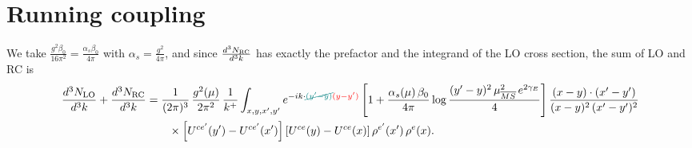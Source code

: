 \documentclass[9pt]{article}
\numberwithin{equation}{section}
\begin{document}
\section{Running coupling}
We take $\frac{g^{2}\beta_{0}}{16\pi^{2}}=\frac{\alpha_{s}\beta_{0}}{4\pi}$ with $\alpha_{s}=\frac{g^{2}}{4\pi}$, and since $\frac{d^{3}N_{\rm RC}}{d^{3}k}$ has exactly the prefactor and the integrand of the LO cross section, the sum of LO and RC is
\begin{align}
\frac{d^{3}N_{\rm LO}}{d^{3}k}+\frac{d^{3}N_{\rm RC}}{d^{3}k}&=\frac{1}{(2\pi)^{3}}\,\frac{g^{2}(\mu)}{2\pi^{2}}\,\frac{1}{k^{+}}\int_{x,y,x',y'}e^{-ik\cdot{\color{teal}\cancel{(y'-y)}}{\color{red}(y-y')}}\left[1+\frac{\alpha_{s}(\mu)\,\beta_{0}}{4\pi}\log\frac{(y'-y)^{2}\,\mu^{2}_{\overline{MS}}\,e^{2\gamma_{E}}}{4}\right]\frac{(x-y)\cdot(x'-y')}{(x-y)^{2}\,(x'-y')^{2}}\notag\\
&\qquad\times\left[U^{ce'}(y')-U^{ce'}(x')\right]\left[U^{ce}(y)-U^{ce}(x)\right]\rho^{e'}(x')\,\rho^{e}(x).

\end{align}
\end{document}

